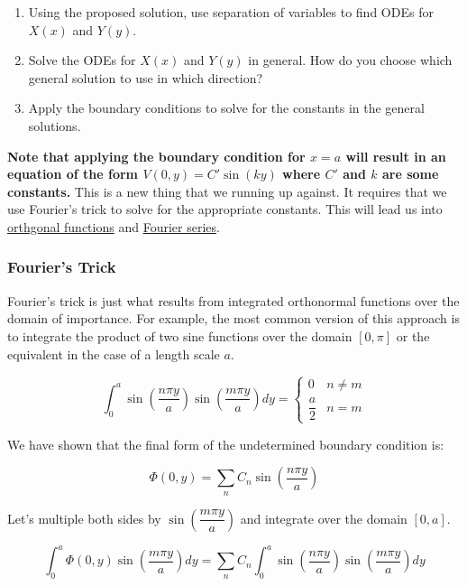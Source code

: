\begin{enumerate}
\def\labelenumi{\arabic{enumi}.}
\tightlist
\item
  Using the proposed solution, use separation of variables to find ODEs
  for \(X(x)\) and \(Y(y)\).
\item
  Solve the ODEs for \(X(x)\) and \(Y(y)\) in general. How do you choose
  which general solution to use in which direction?
\item
  Apply the boundary conditions to solve for the constants in the
  general solutions.
\end{enumerate}

\textbf{Note that applying the boundary condition for \(x=a\) will
result in an equation of the form \(V(0,y) = C'\sin(ky)\) where \(C'\)
and \(k\) are some constants.} This is a new thing that we running up
against. It requires that we use Fourier's trick to solve for the
appropriate constants. This will lead us into
\href{https://en.wikipedia.org/wiki/Orthogonal_functions}{orthgonal
functions} and
\href{https://en.wikipedia.org/wiki/Fourier_series}{Fourier series}.

\subsubsection{Fourier's Trick}\label{fouriers-trick}

Fourier's trick is just what results from integrated orthonormal
functions over the domain of importance. For example, the most common
version of this approach is to integrate the product of two sine
functions over the domain \([0,\pi]\) or the equivalent in the case of a
length scale \(a\).

\[\int_0^a \sin\left(\dfrac{n\pi y}{a}\right) \sin\left(\dfrac{m\pi y}{a}\right) dy = \begin{cases} 0 & n \neq m \\ \dfrac{a}{2} & n = m \end{cases}\]

We have shown that the final form of the undetermined boundary condition
is:

\[\Phi(0,y) = \sum_n C_n \sin\left(\dfrac{n\pi y}{a}\right)\]

Let's multiple both sides by \(\sin\left(\dfrac{m\pi y}{a}\right)\) and
integrate over the domain \([0,a]\).

\[\int_0^a \Phi(0,y) \sin\left(\dfrac{m\pi y}{a}\right) dy = \sum_n C_n \int_0^a \sin\left(\dfrac{n\pi y}{a}\right) \sin\left(\dfrac{m\pi y}{a}\right) dy\]


